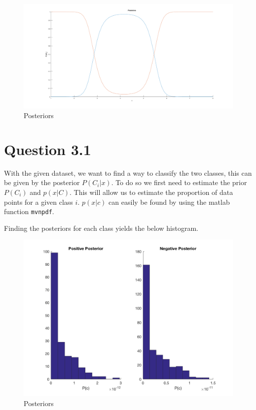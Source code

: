 \begin{figure}[H]
    \includegraphics[width=\linewidth]{../../pracs/week3/images/q4_posteriors}
    \centering
    \caption{Posteriors}
\end{figure}

\section*{Question 3.1}

With the given dataset, we want to find a way to classify the two classes, this can be given by the posterior $P(C_i|x)$. To do so we first need to estimate the prior $P(C_i)$ and $p(x|C)$. This will allow us to estimate the proportion of data points for a given class $i$.  $p(x|c)$ can easily be found by using the matlab function \texttt{mvnpdf}.

Finding the posteriors for each class yields the below histogram.

\begin{figure}[H]
    \includegraphics[width=\linewidth]{../../pracs/week4/images/q1_posteriors}
    \centering
    \caption{Posteriors}
\end{figure}

